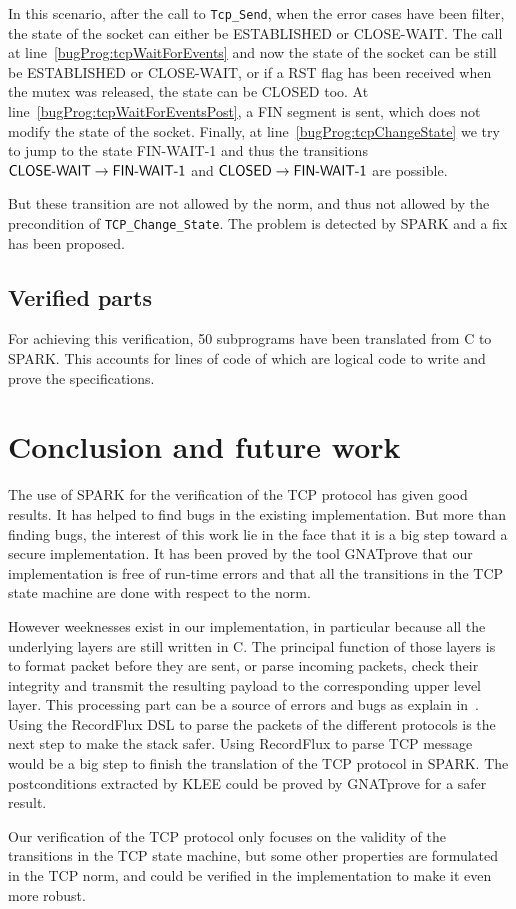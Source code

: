 \documentclass[conference]{IEEEtran}
\def\spark#1{\lstinline[language=Ada]{#1}}
\def\state#1{\textsf{\MakeUppercase{#1}}\xspace}
\def\sclosed{\state{closed}}
\def\sestab{\state{established}}
\def\sfwone{\state{fin-wait-1}}
\def\sclosew{\state{close-wait}}
\def\flag#1{\textsf{#1}\xspace}
\def\rst{\flag{RST}}
\def\fin{\flag{FIN}}
\begin{document}
In this scenario, after the call to \spark{Tcp_Send}, when the error cases have
been filter, the state of the socket can either be \sestab or \sclosew. The call
at line~\ref{bugProg:tcpWaitForEvents} and now the state of the socket can be
still be \sestab or \sclosew, or if a \rst flag has been received when the mutex
was released, the state can be \sclosed too.
At line~\ref{bugProg:tcpWaitForEventsPost}, a \fin segment is sent, which does
not modify the state of the socket. Finally, at line~\ref{bugProg:tcpChangeState}
we try to jump to the state \sfwone and thus the transitions $\text{\sclosew}
\rightarrow \text{\sfwone}$ and $\text{\sclosed} \rightarrow \text{\sfwone}$ are
possible.

But these transition are not allowed by the norm, and thus not allowed by the
precondition of \spark{TCP_Change_State}. The problem is detected by SPARK and a fix
has been proposed.


\subsection{Verified parts}

For achieving this verification, 50 subprograms have been translated from C to
SPARK. This accounts for  lines of code of which  are logical
code to write and prove the specifications.

\section{Conclusion and future work}

The use of SPARK for the verification of the TCP protocol has given good
results. It has helped to find bugs in the existing implementation. But more
than finding bugs, the interest of this work lie in the face that it is a big
step toward a secure implementation. It has been proved by the tool GNATprove
that our implementation is free of run-time errors and that all the transitions
in the TCP state machine are done with respect to the norm.

However weeknesses exist in our implementation, in particular because all the
underlying layers are still written in C. The principal function of those layers
is to format packet before they are sent, or parse incoming packets, check their
integrity and transmit the resulting payload to the corresponding upper level
layer. This processing part can be a source of errors and bugs as explain
in~\cite{Reiher2019RecordFluxFM}.
Using the RecordFlux DSL to parse the packets of the different protocols is the
next step to make the stack safer. Using RecordFlux to parse TCP message
would be a big step to finish the translation of the TCP protocol in SPARK.
The postconditions extracted by KLEE could be proved by GNATprove for a
safer result.

Our verification of the TCP protocol only focuses on the validity of the
transitions in the TCP state machine, but some other properties are formulated
in the TCP norm, and could be verified in the implementation to make it even
more robust.



\end{document}
